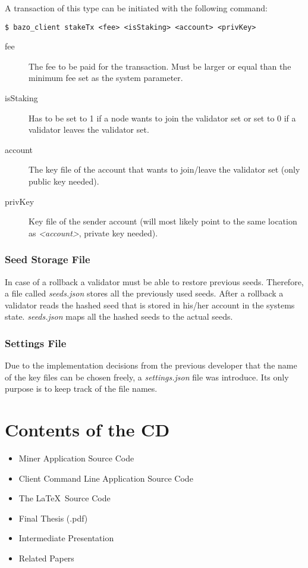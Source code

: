 A transaction of this type can be initiated with the following command:

\begin{lstlisting}
$ bazo_client stakeTx <fee> <isStaking> <account> <privKey>
\end{lstlisting}

\begin{description}
	\item[fee] The fee to be paid for the transaction. Must be larger or equal than the minimum fee set as the system parameter.
	\item[isStaking] Has to be set to 1 if a node wants to join the validator set or set to 0 if a validator leaves the validator set.
	\item[account] The key file of the account that wants to join/leave the validator set (only public key needed).
	\item[privKey] Key file of the sender account (will most likely point to the same location as \emph{\textless account\textgreater}, private key needed). 
\end{description}

\subsection{Seed Storage File}\label{seed-storage}
In case of a rollback a validator must be able to restore previous seeds. Therefore, a file called \emph{seeds.json} stores all the previously used seeds. After a rollback a validator reads the hashed seed that is stored in his/her account in the systems state. \emph{seeds.json} maps all the hashed seeds to the actual seeds. 

\subsection{Settings File}\label{settings-storage}
Due to the implementation decisions from the previous developer that the name of the key files can be chosen freely, a \emph{settings.json} file was introduce. Its only purpose is to keep track of the file names.

\chapter{Contents of the CD}
\begin{itemize}
	\item Miner Application Source Code
	\item Client Command Line Application Source Code
	\item The \LaTeX\ Source Code
	\item Final Thesis (.pdf)
	\item Intermediate Presentation
	\item Related Papers
\end{itemize}